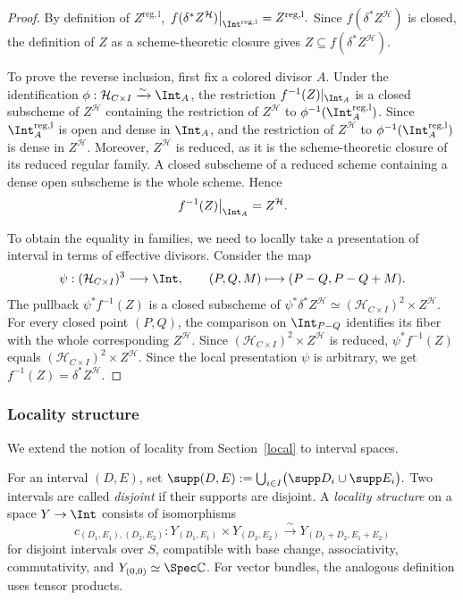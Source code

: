 \documentclass{amsart}
\numberwithin{equation}{section}
\numberwithin{figure}{section}
\theoremstyle{definition}
\theoremstyle{remark}
\renewcommand{\c}[1]{\mathcal{#1}}
\renewcommand{\b}[1]{\mathbb{#1}}
\begin{document}
\begin{proof}
	By definition of $Z^{\mathrm{reg,l}}$, $	\left.f(\delta^*Z^{\c H})\right|_{\Int^{\mathrm{reg,l}}}
		=Z^{\mathrm{reg,l}}.$
		Since $f(\delta^*Z^{\c H})$ is closed, the definition of $Z$
		as a scheme-theoretic closure gives
		$Z\subseteq f(\delta^*Z^{\c H})$.
		
		To prove the reverse inclusion, first fix a colored divisor $A$.
		Under the identification
		$\phi:\c H_{C\times I}\xrightarrow{\sim}\Int_A$, the restriction
		$f^{-1}(Z)|_{\Int_A}$ is a closed subscheme of $Z^{\c H}$
		containing the restriction of $Z^{\c H}$ to $\phi^{-1}(\Int_A^{\mathrm{reg,l}})$.
		Since $\Int_A^{\mathrm{reg,l}}$ is open and dense in $\Int_A$, and 
		the restriction of $Z^{\c H}$ to $\phi^{-1}(\Int_A^{\mathrm{reg,l}})$ is dense in $Z^{\c H}$.
		Moreover, $Z^{\c H}$ is reduced, as it is the scheme-theoretic
		closure of its reduced regular family.
		A closed subscheme of a reduced scheme containing a dense
		open subscheme is the whole scheme. Hence
		\[
		\left.f^{-1}(Z)\right|_{\Int_A}=Z^{\c H}.
		\]
		
	To obtain the equality in families, we need to locally take a presentation of interval in terms of effective divisors. Consider the map
	\[
	\psi:(\c H_{C\times I})^3\longrightarrow\Int,\qquad
	(P,Q,M)\longmapsto(P-Q,P-Q+M).
	\]
	The pullback $\psi^*f^{-1}(Z)$ is a closed subscheme of
	$\psi^*\delta^*Z^{\c H}	\simeq(\c H_{C\times I})^2\times Z^{\c H}$.
	For every closed point $(P,Q)$, the comparison on $\Int_{P-Q}$ identifies its fiber with the whole corresponding $Z^{\c H}$. Since $(\c H_{C\times I})^2\times Z^{\c H}$ is reduced, $\psi^*f^{-1}(Z)$ equals $(\c H_{C\times I})^2\times Z^{\c H}$. Since the local presentation $\psi$ is arbitrary, we get $f^{-1}(Z)=\delta^*Z^{\c H}$.
	\end{proof}


\subsubsection{Locality structure}
\label{subsec:interval-locality}

We extend the notion of locality from Section~\ref{local}
to interval spaces.

For an interval $(D,E)$, set
$\supp(D,E):=\bigcup_{i\in I}\bigl(\supp D_i\cup\supp E_i\bigr).$
Two intervals are called \emph{disjoint} if their supports
are disjoint.
A \emph{locality structure} on a space $Y\to\Int$ consists
of isomorphisms
\[
c_{(D_1,E_1),(D_2,E_2)}:
Y_{(D_1,E_1)}\times Y_{(D_2,E_2)}
\xrightarrow{\sim}
Y_{(D_1+D_2,E_1+E_2)}
\]
for disjoint intervals over $S$, compatible with base
change, associativity, commutativity, and $Y_{(0,0)}\simeq\Spec\b C$.
For vector bundles, the analogous definition uses tensor
products.
\end{document}

